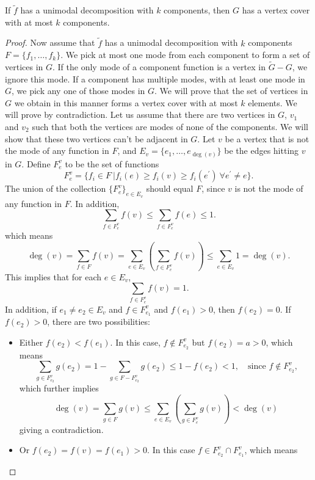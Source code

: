 \documentclass[10pt,a4paper]{amsart}
\begin{document}
\begin{lem}
\label{lem:umd}
    If $\tilde{f}$ has a unimodal decomposition with $k$ components, then $G$ has a vertex cover with at most $k$ components.
\end{lem}

\begin{proof}
Now assume that $\tilde{f}$ has a unimodal decomposition with $k$ components $F = \{f_1, \ldots, f_k\}$. We pick at most one mode from each component to form a set of vertices in $G$. If the only mode of a component function is a vertex in $\tilde{G} - G$, we ignore this mode. If a component has multiple modes, with at least one mode in $G$, we pick any one of those modes in $G$. We will prove that the set of vertices in $G$ we obtain in this manner forms a vertex cover with at most $k$ elements. We will prove by contradiction. Let us assume that there are two vertices in $G$, $v_1$ and $v_2$ such that both the vertices are modes of none of the components. We will show that these two vertices can't be adjacent in $G$. Let $v$ be a vertex that is not the mode of any function in $F$, and $E_v = \{e_1, \ldots, e_{\deg(v)}\}$ be the edges hitting $v$ in $G$. Define $F^{v}_{e}$ to be the set of functions
\[
	F^{v}_{e} = \{ f_i \in F \ | f_i(e)  \geq f_i(v) \geq f_i(e^{'}) \ \forall e^{'} \neq e \}.
\]
The union of the collection $\{ F^{v}_{e} \}_{e \in E_v}$ should equal $F$, since $v$ is not the mode of any function in $F$. In addition, 
\[
	\sum_{f \in F^{v}_{e}} f(v) \leq \sum_{f \in F^{v}_{e}} f(e) \leq 1.
\]
which means 
\begin{equation}
\label{impsum1}
	\deg(v) = \sum_{f \in F} f(v) = \sum_{e \in E_v} \left( \sum_{f \in F^{v}_{e}} f(v) \right) \leq \sum_{e \in E_v} 1 = \deg(v).
\end{equation}
This implies that for each $e \in E_v$,
\[
	\sum_{f \in F^{v}_{e}} f(v) = 1.
\]
In addition, if $e_1 \neq e_2 \in E_v$ and $f \in F^{v}_{e_1}$ and $f(e_1) > 0$, then $f(e_2) = 0$. If $f(e_2) > 0$, there are two possibilities:
\begin{itemize}
	\item Either $f(e_2) <  f(e_1)$. In this case, $f \notin F^{v}_{e_2}$ but $f(e_2) = a > 0$, which means
	\[
		\sum_{g \in F^{v}_{e_2}} g(e_2) = 1 - \sum_{g \in F-F^{v}_{e_2}} g(e_2) \leq 1-f(e_2) < 1, \quad \text{since $f \notin F^{v}_{e_2}$,}
	\] 
	which further implies
	\[
		\deg(v) = \sum_{g \in F} g(v) \leq \sum_{e \in E_v} \left( \sum_{g \in F^{v}_{e}} g(v) \right)  < \deg(v)
	\]
	giving a contradiction.
	\item Or $f(e_2) = f(v) = f(e_1) > 0$. In this case $f \in F^v_{e_2} \cap F^v_{e_1}$, which means

\end{itemize}
\end{proof}
\end{document}
